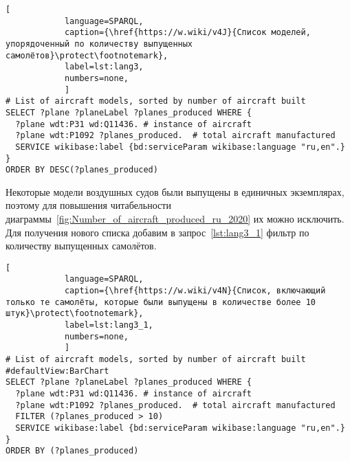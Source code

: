 \begin{lstlisting}[ 
            language=SPARQL, 
            caption={\href{https://w.wiki/v4J}{Список моделей, упорядоченный по количеству выпущенных самолётов}\protect\footnotemark}, 
            label=lst:lang3, 
            numbers=none,
            ]
# List of aircraft models, sorted by number of aircraft built
SELECT ?plane ?planeLabel ?planes_produced WHERE {
  ?plane wdt:P31 wd:Q11436. # instance of aircraft
  ?plane wdt:P1092 ?planes_produced.  # total aircraft manufactured
  SERVICE wikibase:label {bd:serviceParam wikibase:language "ru,en".}
}
ORDER BY DESC(?planes_produced)
\end{lstlisting}


Некоторые модели воздушных судов были выпущены в единичных экземплярах, поэтому для повышения читабельности диаграммы~\ref{fig:Number_of_aircraft_produced_ru_2020} их можно исключить. Для получения нового списка добавим в запрос~\ref{lst:lang3_1} фильтр по количеству выпущенных самолётов.


\begin{lstlisting}[ 
            language=SPARQL, 
            caption={\href{https://w.wiki/v4N}{Список, включающий только те самолёты, которые были выпущены в количестве более 10 штук}\protect\footnotemark}, 
            label=lst:lang3_1, 
            numbers=none,
            ]
# List of aircraft models, sorted by number of aircraft built
#defaultView:BarChart
SELECT ?plane ?planeLabel ?planes_produced WHERE {
  ?plane wdt:P31 wd:Q11436. # instance of aircraft
  ?plane wdt:P1092 ?planes_produced.  # total aircraft manufactured
  FILTER (?planes_produced > 10)
  SERVICE wikibase:label {bd:serviceParam wikibase:language "ru,en".}
}
ORDER BY (?planes_produced)
\end{lstlisting}



